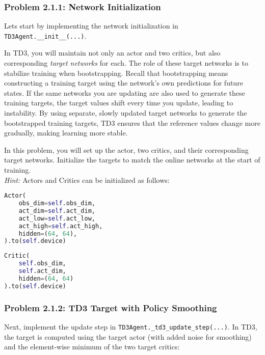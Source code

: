 \documentclass[12pt]{article}
\begin{document}
\subsubsection*{Problem 2.1.1: Network Initialization}
Lets start by implementing the network initialization in \texttt{TD3Agent.__init__(...)}.

In TD3, you will maintain not only an actor and two critics, but also corresponding \emph{target networks} for each. The role of these target networks is to stabilize training when bootstrapping. Recall that bootstrapping means constructing a training target using the network’s own predictions for future states. If the same networks you are updating are also used to generate these training targets, the target values shift every time you update, leading to instability. By using separate, slowly updated target networks to generate the bootstrapped training targets, TD3 ensures that the reference values change more gradually, making learning more stable.

In this problem, you will set up the actor, two critics, and their corresponding target networks. Initialize the targets to match the online networks at the start of training. \\
\textit{Hint:} Actors and Critics can be initialized as follows:

\begin{minipage}{0.45\linewidth}
\begin{lstlisting}[language=Python]
Actor(
    obs_dim=self.obs_dim,
    act_dim=self.act_dim,
    act_low=self.act_low,
    act_high=self.act_high,
    hidden=(64, 64),
).to(self.device)
\end{lstlisting}
\end{minipage}
\hfill
\begin{minipage}{0.45\linewidth}
\begin{lstlisting}[language=Python]
Critic(
    self.obs_dim,
    self.act_dim,
    hidden=(64, 64)
).to(self.device)
\end{lstlisting}
\end{minipage}

\subsubsection*{Problem 2.1.2: TD3 Target with Policy Smoothing}

Next, implement the update step in \texttt{TD3Agent.\_td3\_update\_step(...)}.  
In TD3, the target is computed using the target actor (with added noise for smoothing) and the element-wise minimum of the two target critics:  
\end{document}
